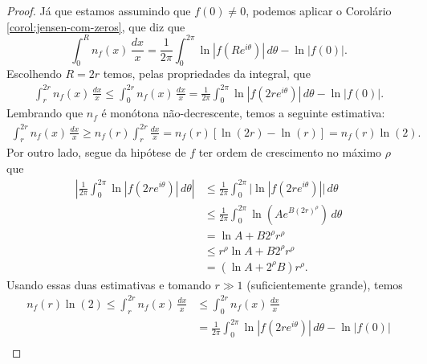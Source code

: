 \begin{proof}
       
       Já que estamos assumindo que $f(0) \neq 0$, podemos aplicar o 
       Corolário \ref{corol:jensen-com-zeros}, que diz que
       \begin{equation*}
           \int_0^R n_f(x) \, \frac{dx}{x} 
           = \frac{1}{2\pi} \int_0^{2\pi} \ln|f(Re^{i\theta})| \, d\theta - \ln|f(0)|.
       \end{equation*}
       Escolhendo $R = 2r$ temos, pelas propriedades da integral, que
       \begin{align*}
           \int_r^{2r} n_f(x) \, \frac{dx}{x}
           \leq \int_0^{2r} n_f(x) \, \frac{dx}{x}
           = \frac{1}{2\pi} \int_0^{2\pi} \ln|f(2re^{i\theta})| \, d\theta - \ln|f(0)|.
       \end{align*}
       Lembrando que $n_f$ é monótona não-decrescente, temos a seguinte estimativa:
       \begin{align*}
           \int_r^{2r} n_f(x) \, \frac{dx}{x}
           \geq n_f(r) \int_r^{2r} \frac{dx}{x} 
           = n_f(r)[\ln(2r) - \ln(r)]
           = n_f(r)\ln(2).
       \end{align*}
       Por outro lado, segue da hipótese de $f$ 
       ter ordem de crescimento no máximo $\rho$ que
       \begin{align*}
           \left| \frac{1}{2\pi} \int_0^{2\pi} \ln|f(2re^{i\theta})| \, d\theta \right|
           &\leq \frac{1}{2\pi} \int_0^{2\pi} \big|\ln|f(2re^{i\theta})| \big| \, d\theta 
           \\[0.2cm]
           &\leq \frac{1}{2\pi} \int_0^{2\pi} \ln\left(Ae^{B(2r)^{\rho}}\right) 
           \, d\theta 
           \\[0.2cm]
           &= \ln A + B2^{\rho}r^{\rho} 
           \\[0.2cm]
           &\leq r^{\rho}\ln A + B2^{\rho}r^{\rho} 
           \\[0.2cm]
           &= (\ln A + 2^{\rho}B)r^{\rho}.
       \end{align*}
       Usando essas duas estimativas e tomando $r\gg 1$ (suficientemente grande),
       temos
       \begin{align*}
           n_f(r)\ln(2) \leq \int_r^{2r} n_f(x) \, \frac{dx}{x} 
                        &\leq \int_0^{2r} n_f(x) \, \frac{dx}{x} 
                        \\[0.2cm]
                        &= \frac{1}{2\pi}\int_0^{2\pi} \ln|f(2re^{i\theta})| \, d\theta
                        - \ln|f(0)| 
                        \\[0.2cm]

\end{align*}
\end{proof}
